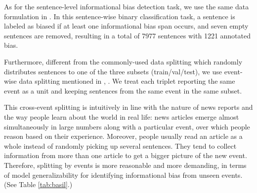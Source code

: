 \documentclass[letterpaper]{article} %
\begin{document}
As for the sentence-level informational bias detection task, we use the same data formulation in \citet{van-den-berg-markert-2020-context}. In this sentence-wise binary classification task, a sentence is labeled as biased if at least one informational bias span occurs, and seven empty sentences are removed, resulting in a total of 7977 sentences with 1221 annotated bias.

Furthermore, different from the commonly-used data splitting which randomly distributes sentences to one of the three subsets (train/val/test), we use event-wise data splitting mentioned in \citet{van-den-berg-markert-2020-context}, \citet{chen-etal-2020-detecting}. We treat each triplet reporting the same event as a unit and keeping sentences from the same event in the same subset. 

This cross-event splitting is intuitively in line with the nature of news reports and the way people learn about the world in real life: news articles emerge almost simultaneously in large numbers along with a particular event, over which people reason based on their experience. Moreover, people usually read an article as a whole instead of randomly picking up several sentences. They tend to collect information from more than one article to get a bigger picture of the new event. Therefore, splitting by events is more reasonable and more demanding, in terms of model generalizability for identifying informational bias from unseen events. (See Table \ref{tab:basil}.)

\end{document}
